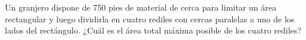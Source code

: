 \item Un granjero dispone de 750 pies de material de cerca para limitar un área rectangular y luego dividirla en cuatro rediles con cercas paralelas a uno de los lados del rectángulo. ¿Cuál es el área total máxima posible de los cuatro rediles?
